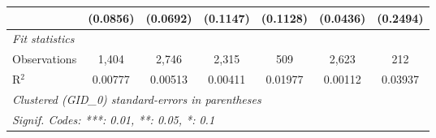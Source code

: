 \begin{tabular}{lcccccc}
                                      & (0.0856)      & (0.0692)      & (0.1147)     & (0.1128)      & (0.0436) & (0.2494)\\   
   \midrule
   \emph{Fit statistics}\\
   Observations                       & 1,404         & 2,746         & 2,315        & 509           & 2,623    & 212\\  
   R$^2$                              & 0.00777       & 0.00513       & 0.00411      & 0.01977       & 0.00112  & 0.03937\\  
   \midrule \midrule
   \multicolumn{7}{l}{\emph{Clustered (GID\_0) standard-errors in parentheses}}\\
   \multicolumn{7}{l}{\emph{Signif. Codes: ***: 0.01, **: 0.05, *: 0.1}}\\
\end{tabular}
\par\endgroup



